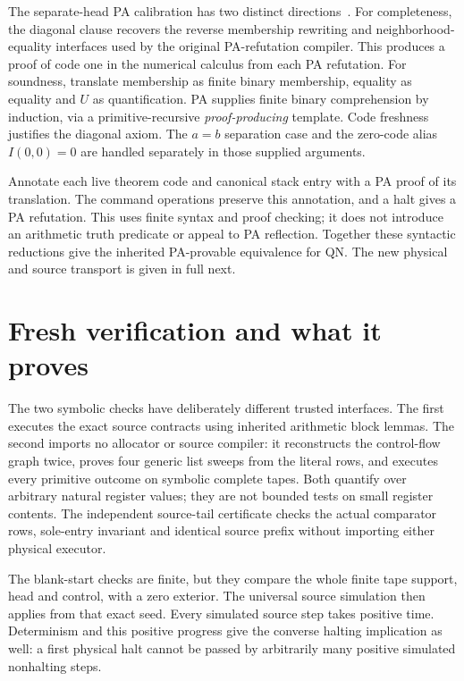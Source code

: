 \documentclass[11pt,letterpaper]{article}
\begin{document}
The separate-head PA calibration has two distinct directions~\cite{primary,qn}.
For completeness, the diagonal clause recovers the reverse membership
rewriting and neighborhood-equality interfaces used by the original
PA-refutation compiler. This produces a proof of code one in the numerical
calculus from each PA refutation. For soundness, translate membership as
finite binary membership, equality as equality and $U$ as quantification.
PA supplies finite binary comprehension by induction, via a
primitive-recursive \emph{proof-producing} template. Code freshness
justifies the diagonal axiom. The $a=b$ separation case and the zero-code
alias $I(0,0)=0$ are handled separately in those supplied arguments.

Annotate each live theorem code and canonical stack entry with a PA proof
of its translation. The command operations preserve this annotation, and
a halt gives a PA refutation. This uses finite syntax and proof checking;
it does not introduce an arithmetic truth predicate or appeal to PA
reflection. Together these syntactic reductions give the inherited
PA-provable equivalence for QN. The new physical and source transport is
given in full next.



\section{Fresh verification and what it proves}
\label{sec:verification}



The two symbolic checks have deliberately different trusted interfaces.
The first executes the exact source contracts using inherited arithmetic
block lemmas. The second imports no allocator or source compiler: it
reconstructs the control-flow graph twice, proves four generic list sweeps
from the literal rows, and executes every primitive outcome on symbolic
complete tapes. Both quantify over arbitrary natural register values;
they are not bounded tests on small register contents. The independent
source-tail certificate checks the actual comparator rows, sole-entry
invariant and identical source prefix without importing either physical
executor.

The blank-start checks are finite, but they compare the whole finite tape
support, head and control, with a zero exterior. The universal source
simulation then applies from that exact seed. Every simulated source step
takes positive time. Determinism and this positive progress give the
converse halting implication as well: a first physical halt cannot be
passed by arbitrarily many positive simulated nonhalting steps.
\end{document}
